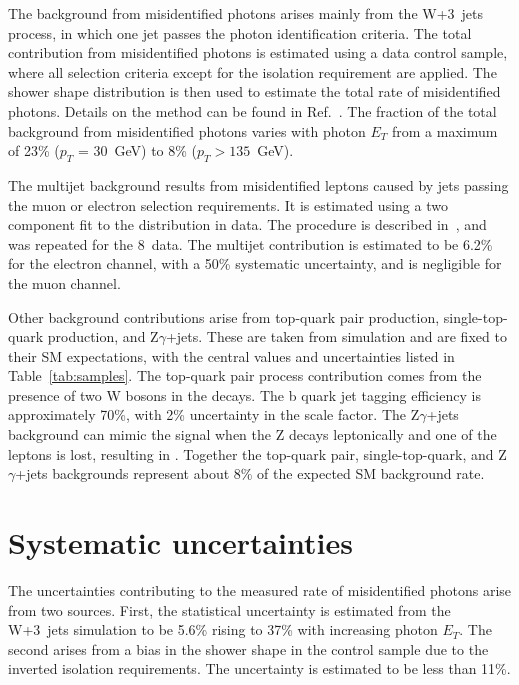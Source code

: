 The background from misidentified photons arises mainly from the
W+3~jets process, in which one jet passes the photon identification
criteria. The total contribution from misidentified photons is
estimated using a data control sample, where all selection criteria
except for the isolation requirement are applied. The shower shape
distribution is then used to estimate the total rate of misidentified
photons. Details on the method can be found in Ref.~\cite{Vgamma}. The
fraction of the total background from misidentified photons varies
with photon $E_{T}$ from a maximum of 23\% ($p_{T}$ = 30~GeV) to 8\%
($p_{T}>135$~GeV).

The multijet background results from misidentified leptons caused by
jets passing the muon or electron selection requirements. It is
estimated using a two component fit to the \MET distribution in
data. The procedure is described in~\cite{Chatrchyan:2012bd}, and was
repeated for the 8~\TeV data. The multijet contribution is estimated
to be 6.2\% for the electron channel, with a 50\% systematic
uncertainty, and is negligible for the muon channel.

Other background contributions arise from top-quark pair production,
single-top-quark production, and Z$\gamma$+jets. These are taken from
simulation and are fixed to their SM expectations, with the central
values and uncertainties listed in Table~\ref{tab:samples}. The
top-quark pair process contribution comes from the presence of two W
bosons in the decays. The b quark jet tagging efficiency is
approximately 70\%, with 2\% uncertainty in the scale factor. The
Z$\gamma$+jets background can mimic the signal when the Z decays
leptonically and one of the leptons is lost, resulting in
\MET. Together the top-quark pair, single-top-quark, and
Z$\gamma$+jets backgrounds represent about 8\% of the expected SM
background rate.

\section{Systematic uncertainties}
\label{sec:Syst}

The uncertainties contributing to the measured rate of misidentified
photons arise from two sources. First, the statistical uncertainty is estimated
from the W+3~jets simulation to be 5.6\% rising to 37\% with increasing photon
$E_T$. The second arises from a bias in the shower shape in the control sample due to the
inverted isolation requirements. The uncertainty is estimated to be less than 11\%. 

